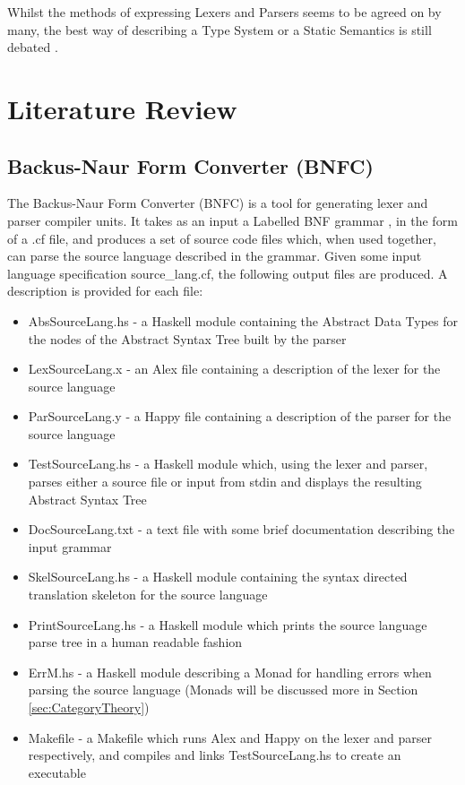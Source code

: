 \documentclass{UoYCSproject}
\begin{document}
Whilst the methods of expressing Lexers and Parsers seems to be agreed on by
many, the best way of describing a Type System or a Static Semantics is still
debated \cite{NeilJones}.

\chapter{Literature Review}

\section{Backus-Naur Form Converter (BNFC)}
\label{sec:BNFC}

The Backus-Naur Form Converter (BNFC) is a tool for generating lexer and parser
compiler units. It takes as an input a Labelled BNF grammar \cite{LBNFReport},
in the form of a {\ttfamily .cf} file, and produces a set of source code files
which, when used together, can parse the source language described in the
grammar. Given some input language specification {\ttfamily source\_lang.cf},
the following output files are produced. A description is provided for each
file:
\begin{itemize}
    \item {\ttfamily AbsSourceLang.hs} - a Haskell module containing the Abstract
        Data Types for the nodes of the Abstract Syntax Tree built by the
        parser
    \item {\ttfamily LexSourceLang.x} - an Alex file containing a description
        of the lexer for the source language
    \item {\ttfamily ParSourceLang.y} - a Happy file containing a description
        of the parser for the source language
    \item {\ttfamily TestSourceLang.hs} - a Haskell module which, using the lexer
        and parser, parses either a source file or input from stdin and
        displays the resulting Abstract Syntax Tree
    \item {\ttfamily DocSourceLang.txt} - a text file with some brief
        documentation describing the input grammar
    \item {\ttfamily SkelSourceLang.hs} - a Haskell module containing the syntax
        directed translation skeleton for the source language
    \item {\ttfamily PrintSourceLang.hs} - a Haskell module which prints the
        source language parse tree in a human readable fashion
    \item {\ttfamily ErrM.hs} - a Haskell module describing a Monad for handling
        errors when parsing the source language (Monads will be discussed more
        in Section \ref{sec:CategoryTheory})
    \item {\ttfamily Makefile} - a Makefile which runs Alex and Happy on the
        lexer and parser respectively, and compiles and links TestSourceLang.hs
        to create an executable
\end{itemize}
\end{document}
